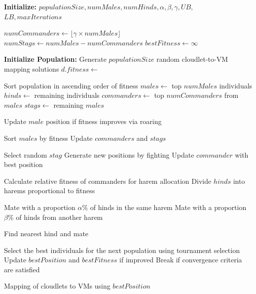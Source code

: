 \documentclass[pdflatex,sn-mathphys-num]{sn-jnl}%
\begin{document}
\begin{algorithm}
\small
\caption{RDA for Load Balancing in Cloud Computing}\label{alg:rda_load_balancing}
\begin{algorithmic}[1]
    \State \textbf{Initialize:} $populationSize, numMales, numHinds, \alpha, \beta, \gamma, UB,$
    \State \hspace{10em} $LB, maxIterations$

    \State $numCommanders \gets \lfloor \gamma \times numMales \rfloor$
    \State $numStags \gets numMales - numCommanders$
    \State $bestFitness \gets \infty$

    \State \textbf{Initialize Population:} Generate $populationSize$ random cloudlet-to-VM mapping solutions
        \State $d.fitness \gets$ 
    \EndFor

    \State Sort population in ascending order of fitness
    \State $males \gets$ top $numMales$ individuals
    \State $hinds \gets$ remaining individuals
    \State $commanders \gets$ top $numCommanders$ from $males$
    \State $stags \gets$ remaining $males$

            \State Update $male$ position if fitness improves via roaring
        \EndFor

        \State Sort $males$ by fitness
        \State Update $commanders$ and $stags$

            \State Select random $stag$
            \State Generate new positions by fighting
            \State Update $commander$ with best position
        \EndFor

        \State Calculate relative fitness of commanders for harem allocation
        \State Divide $hinds$ into harems proportional to fitness

            \State Mate with a proportion $\alpha\%$ of hinds in the same harem
            \State Mate with a proportion $\beta\%$ of hinds from another harem
        \EndFor

            \State Find nearest hind and mate
        \EndFor

        \State Select the best individuals for the next population using tournament selection
        \State Update $bestPosition$ and $bestFitness$ if improved
        \State Break if convergence criteria are satisfied
    \EndFor

    \State \Return Mapping of cloudlets to VMs using $bestPosition$
\EndProcedure
\end{algorithmic}
\end{algorithm}
\end{document}
